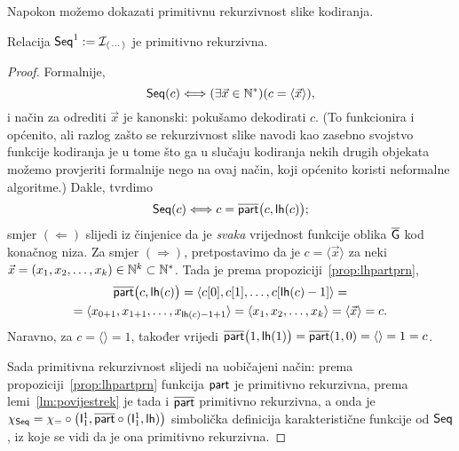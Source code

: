 Napokon možemo dokazati primitivnu rekurzivnost slike kodiranja.

\begin{korolar}
    Relacija $\mathsf{Seq}^1:=\mathcal I_{\langle\,\cdots\rangle}$ je primitivno rekurzivna.
\end{korolar}
\begin{proof}
Formalnije,  \begin{equation}
    \mathsf{Seq}(c)\Longleftrightarrow(\exists\vec x\in{\mathbb N}^*)(c=\langle\vec x\rangle)\text,
\end{equation}
i način za odrediti $\vec x$ je kanonski: pokušamo dekodirati $c$. (To funkcionira i općenito, ali razlog zašto se rekurzivnost slike navodi kao zasebno svojstvo funkcije kodiranja je u tome što ga u slučaju kodiranja nekih drugih objekata možemo provjeriti formalnije nego na ovaj način, koji općenito koristi neformalne algoritme.) Dakle, tvrdimo
\begin{equation}
    \mathsf{Seq}(c)\Longleftrightarrow c=\overline{\mathsf{part}}\bigl(c,\mathsf{lh}(c)\bigr)\text;
\end{equation}
smjer $(\Leftarrow)$ slijedi iz činjenice da je \emph{svaka} vrijednost funkcije oblika $\overline{\mathsf G}$ kod konačnog niza. Za smjer $(\Rightarrow)$, pretpostavimo da je $c=\langle\vec x\rangle$ za neki $\vec x=(x_1,x_2,\dotsc,x_k)\in{\mathbb N}^k\subset{\mathbb N}^*$. Tada je prema propoziciji~\ref{prop:lhpartprn},
\begin{multline}
    \overline{\mathsf{part}}\bigl(c,\mathsf{lh}(c)\bigr)=\langle c[0],c[1],\dotsc,c[\mathsf{lh}(c)-1]\rangle=\\
    =\langle x_{0+1},x_{1+1},\dotsc,x_{\mathsf{lh}(c)-1+1}\rangle=\langle x_1,x_2,\dotsc,x_k\rangle=\langle\vec x\rangle=c\text.
\end{multline}
Naravno, za $c=\langle\rangle=1$, također vrijedi $\overline{\mathsf{part}}\bigl(1,\mathsf{lh}(1)\bigr)=\overline{\mathsf{part}}(1,0)=\langle\rangle=1=c$.

Sada primitivna rekurzivnost slijedi na uobičajeni način: prema propoziciji~\ref{prop:lhpartprn} funkcija $\mathsf{part}$ je primitivno rekurzivna, prema lemi~\ref{lm:povijestrek} je tada i $\overline{\mathsf{part}}$ primitivno rekurzivna, a onda je $\chi_{\mathsf{Seq}}=\chi_=\circ\bigl(\mathsf I_1^1,\overline{\mathsf{part}}\circ(\mathsf I_1^1,\mathsf{lh})\bigr)$ simbolička definicija karakteristične funkcije od $\mathsf{Seq}$, iz koje se vidi da je ona primitivno rekurzivna.
\end{proof}

